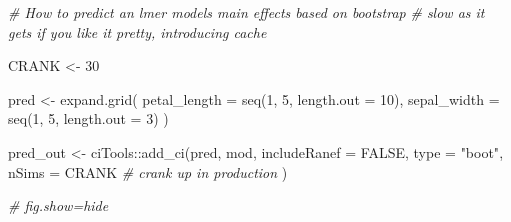 \documentclass[]{elsarticle} %
\newenvironment{Shaded}{\begin{snugshade}}{\end{snugshade}}
\newcommand{\AttributeTok}[1]{\textcolor[rgb]{0.77,0.63,0.00}{#1}}
\newcommand{\CommentTok}[1]{\textcolor[rgb]{0.56,0.35,0.01}{\textit{#1}}}
\newcommand{\ConstantTok}[1]{\textcolor[rgb]{0.00,0.00,0.00}{#1}}
\newcommand{\DecValTok}[1]{\textcolor[rgb]{0.00,0.00,0.81}{#1}}
\newcommand{\FunctionTok}[1]{\textcolor[rgb]{0.00,0.00,0.00}{#1}}
\newcommand{\NormalTok}[1]{#1}
\newcommand{\OtherTok}[1]{\textcolor[rgb]{0.56,0.35,0.01}{#1}}
\newcommand{\SpecialCharTok}[1]{\textcolor[rgb]{0.00,0.00,0.00}{#1}}
\newcommand{\StringTok}[1]{\textcolor[rgb]{0.31,0.60,0.02}{#1}}
\begin{document}
\begin{Shaded}
\begin{Highlighting}[]
\CommentTok{\# How to predict an lmer model\textquotesingle{}s main effects based on bootstrap}
\CommentTok{\# slow as it gets if you like it pretty, introducing cache}

\NormalTok{CRANK }\OtherTok{\textless{}{-}} \DecValTok{30}

\NormalTok{pred }\OtherTok{\textless{}{-}} \FunctionTok{expand.grid}\NormalTok{(}
  \AttributeTok{petal\_length =} \FunctionTok{seq}\NormalTok{(}\DecValTok{1}\NormalTok{, }\DecValTok{5}\NormalTok{, }\AttributeTok{length.out =} \DecValTok{10}\NormalTok{),}
  \AttributeTok{sepal\_width  =} \FunctionTok{seq}\NormalTok{(}\DecValTok{1}\NormalTok{, }\DecValTok{5}\NormalTok{, }\AttributeTok{length.out =} \DecValTok{3}\NormalTok{)}
\NormalTok{)}

\NormalTok{pred\_out }\OtherTok{\textless{}{-}}\NormalTok{ ciTools}\SpecialCharTok{::}\FunctionTok{add\_ci}\NormalTok{(pred, mod,}
  \AttributeTok{includeRanef =} \ConstantTok{FALSE}\NormalTok{, }\AttributeTok{type =} \StringTok{"boot"}\NormalTok{,}
  \AttributeTok{nSims =}\NormalTok{ CRANK }\CommentTok{\# crank up in production}
\NormalTok{)}

\CommentTok{\# fig.show=\textquotesingle{}hide\textquotesingle{}}


\end{Highlighting}
\end{Shaded}
\end{document}
